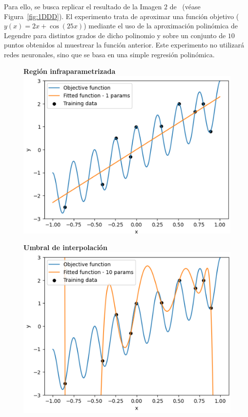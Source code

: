 Para ello, se busca replicar el resultado de la Imagen $2$ de~\cite{Schaeffer2023} (véase Figura~\ref{fig:1DDD}). El experimento trata de aproximar una función objetivo ($y(x) = 2x + \cos(25x)$) mediante el uso de la aproximación polinómica de Legendre para distintos grados de dicho polinomio y sobre un conjunto de $10$ puntos obtenidos al muestrear la función anterior. Este experimento no utilizará redes neuronales, sino que se basa en una simple regresión polinómica.\newline

\begin{figure}[h]
    \centering
    \begin{minipage}{0.32\textwidth}
        \centering
        \textbf{Región infraparametrizada} \\[0.5ex] 
        \includegraphics[width=\linewidth]{img/experiments/legendre1.png}
    \end{minipage}
    \begin{minipage}{0.32\textwidth}
        \centering
        \textbf{Umbral de interpolación} \\[0.5ex] 
        \includegraphics[width=\linewidth]{img/experiments/legendre2.png}

\end{minipage}
\end{figure}
